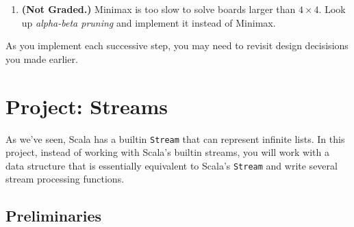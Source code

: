\documentclass[9pt]{extbook}
\begin{document}
\begin{enumerate}
\quad
{}
\quad
{}

\item\textbf{(Not Graded.)} Minimax is too slow to solve boards larger than
$4 \times 4$. Look up \emph{alpha-beta pruning} and implement it instead
of Minimax.

\end{enumerate}

As you implement each successive step, you may need to revisit design
decisisions you made earlier.



\chapter{Project: Streams}

As we've seen, Scala has a builtin \lstinline|Stream| that can represent
infinite lists. In this project, instead of working with Scala's builtin
streams, you will work with a data structure that is essentially equivalent to
Scala's \lstinline|Stream| and write several stream processing functions.

\section{Preliminaries}
\end{document}
